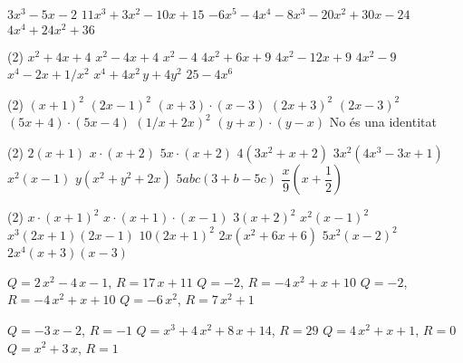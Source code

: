 \documentclass{article}
\let\frac\dfrac
\begin{document}
\begin{multicols}{2}
\begin{mylist}
\item \begin{tasks}
	\task $3x^3-5x-2$
	\task $11x^3+3x^2-10x+15$
	\task $-6x^5-4x^4-8x^3-20x^2+30x-24$
	\task $4x^4+24x^2+36$
\end{tasks}

\item  \begin{tasks}(2)
	\task $x^2+4x+4$
	\task $x^2-4x+4$
	\task $x^2-4$
	\task $4x^2+6x+9$
	\task $4x^2-12x+9$
	\task $4x^2 - 9$
	\task $x^4 - 2x + 1/x^2$
	\task $x^4+4x^2\, y+4y^2$
	\task $25-4x^6$
\end{tasks}
  	
  	\item  \begin{tasks}(2)
  		\task $(x+1)^2$
  		\task $(2x-1)^2$
  		\task $(x+3)\cdot(x-3)$
  		\task $(2x+3)^2$
  		\task $(2x-3)^2$
  		\task $(5x+4)\cdot (5x-4)$
  		\task $\left(1/x + 2x\right)^2$
  		\task $(y+x)\cdot (y-x)$
  		\task No és una identitat
  	\end{tasks}
  		
  \item   \begin{tasks}(2)
  	\task $2(x+1)$
  	\task $x\cdot (x+2)$
  	\task $5x \cdot (x+2)$
  	\task $4 (3x^2+x+2)$
  	\task $3 x^2 (4x^3-3x+1)$
  	\task $x^2 (x-1)$
  	\task $y (x^2 + y^2 + 2x)$
  	\task $5 a b c (3+b-5c)$
  	\task $\frac{x}{9} \left(x+\frac{1}{2}\right)$
  \end{tasks}
 
\item  \begin{tasks}(2)
	\task $x\cdot (x+1)^2$
	\task $x \cdot (x+1) \cdot (x-1)$
	\task $3 (x+2)^2$
	\task $x^2 (x-1)^2$
	\task $x^3 (2x+1)(2x-1)$
	\task $10 (2x+1)^2$
	\task $2x(x^2+6x+6)$
	\task $5x^2 ( x-2)^2$
	\task $2x^4 (x+3)(x-3)$ 
\end{tasks}


	\item 
\begin{tasks} 
	\task $Q=2\,x^2-4\,x-1$, $R= 17\,x+11$ 
	\task $Q=-2$, $R= -4\,x^2+x+10$
	\task $Q=-2$, $R= -4\,x^2+x+10 $
	\task $Q=-6\,x^2 $, $R=7\,x^2+1$  
\end{tasks}
 
\item 
\begin{tasks}
	\task $Q=-3\,x-2 $, $R=-1$  
	\task $Q= x^3+4\,x^2+8\,x+14 $, $R=29$  
	\task $Q=4\,x^2+x+1$, $R=0$  
	\task $Q= x^2+3\,x $, $R=1$ 
\end{tasks}



\end{mylist}
\end{multicols}
\end{document}
